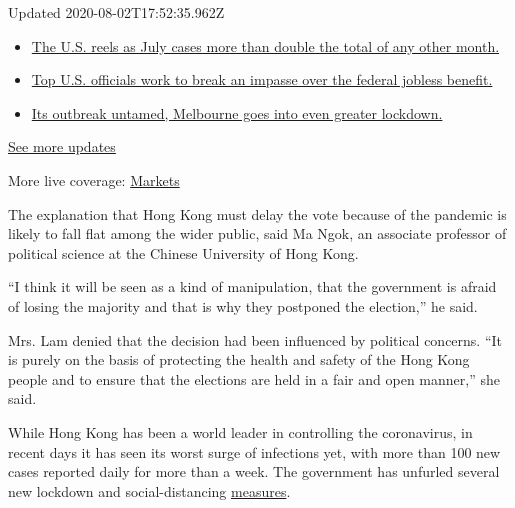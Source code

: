 Updated 2020-08-02T17:52:35.962Z

\begin{itemize}
\tightlist
\item
  \href{https://www.nytimes.com/2020/08/01/world/coronavirus-covid-19.html?action=click\&pgtype=Article\&state=default\&region=MAIN_CONTENT_1\&context=storylines_live_updates\#link-34047410}{The
  U.S. reels as July cases more than double the total of any other
  month.}
\item
  \href{https://www.nytimes.com/2020/08/01/world/coronavirus-covid-19.html?action=click\&pgtype=Article\&state=default\&region=MAIN_CONTENT_1\&context=storylines_live_updates\#link-780ec966}{Top
  U.S. officials work to break an impasse over the federal jobless
  benefit.}
\item
  \href{https://www.nytimes.com/2020/08/01/world/coronavirus-covid-19.html?action=click\&pgtype=Article\&state=default\&region=MAIN_CONTENT_1\&context=storylines_live_updates\#link-2bc8948}{Its
  outbreak untamed, Melbourne goes into even greater lockdown.}
\end{itemize}

\href{https://www.nytimes.com/2020/08/01/world/coronavirus-covid-19.html?action=click\&pgtype=Article\&state=default\&region=MAIN_CONTENT_1\&context=storylines_live_updates}{See
more updates}

More live coverage:
\href{https://www.nytimes.com/live/2020/07/31/business/stock-market-today-coronavirus?action=click\&pgtype=Article\&state=default\&region=MAIN_CONTENT_1\&context=storylines_live_updates}{Markets}

The explanation that Hong Kong must delay the vote because of the
pandemic is likely to fall flat among the wider public, said Ma Ngok, an
associate professor of political science at the Chinese University of
Hong Kong.

``I think it will be seen as a kind of manipulation, that the government
is afraid of losing the majority and that is why they postponed the
election,'' he said.

Mrs. Lam denied that the decision had been influenced by political
concerns. ``It is purely on the basis of protecting the health and
safety of the Hong Kong people and to ensure that the elections are held
in a fair and open manner,'' she said.

While Hong Kong has been a world leader in controlling the coronavirus,
in recent days it has seen its worst surge of infections yet, with more
than 100 new cases reported daily for more than a week. The government
has unfurled several new lockdown and social-distancing
\href{https://www.nytimes.com/2020/07/31/world/asia/hongkong-dining-lunch-coronavirus.html}{measures}.

